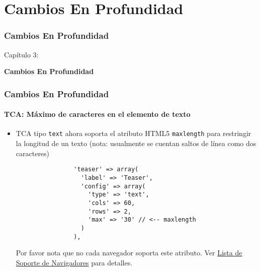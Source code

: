 %

\section{Cambios En Profundidad}
\begin{frame}[fragile]
	\frametitle{Cambios En Profundidad}

	\begin{center}\huge{Capítulo 3:}\end{center}
	\begin{center}\huge{\color{typo3darkgrey}\textbf{Cambios En Profundidad}}\end{center}

\end{frame}


\begin{frame}[fragile]
	\frametitle{Cambios En Profundidad}
	\framesubtitle{TCA: Máximo de caracteres en el elemento de texto}

	\begin{itemize}
		\item TCA tipo \texttt{text} ahora soporta el atributo HTML5 \texttt{maxlength}
			para restringir la longitud de un texto (nota: usualmente se cuentan saltos de línea como dos
			caracteres)

			\begin{lstlisting}
				'teaser' => array(
				  'label' => 'Teaser',
				  'config' => array(
				    'type' => 'text',
				    'cols' => 60,
				    'rows' => 2,
				    'max' => '30' // <-- maxlength
				  )
				),
			\end{lstlisting}

			Por favor nota que no cada navegador soporta este atributo.\newline
			Ver \href{http://www.w3schools.com/tags/att_textarea_maxlength.asp}{Lista de Soporte de Navigadores} para detalles.

	\end{itemize}

\end{frame}

